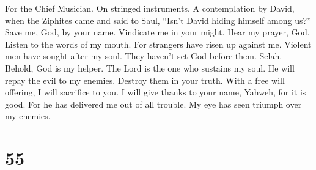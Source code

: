For the Chief Musician. On stringed instruments. A contemplation by
David, when the Ziphites came and said to Saul, ``Isn't David hiding
himself among us?''  Save me, God, by your name. Vindicate
me in your might.  Hear my prayer, God. Listen to the words
of my mouth.  For strangers have risen up against me.
Violent men have sought after my soul. They haven't set God before them.
Selah.  Behold, God is my helper. The Lord is the one who
sustains my soul.  He will repay the evil to my enemies.
Destroy them in your truth.  With a free will offering, I
will sacrifice to you. I will give thanks to your name, Yahweh, for it
is good.  For he has delivered me out of all trouble. My eye
has seen triumph over my enemies.

\hypertarget{section-53}{%
\section{55}\label{section-53}}

